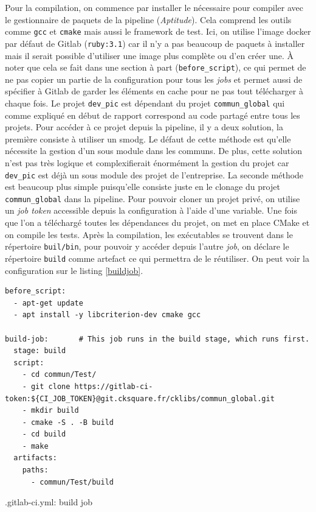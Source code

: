 \documentclass[a4paper]{article}
\begin{document}
Pour la compilation, on commence par installer le nécessaire pour compiler avec
le gestionnaire de paquets de la pipeline (\textit{Aptitude}). Cela comprend les
outils comme \verb|gcc| et \verb|cmake| mais aussi le framework de test. Ici, on
utilise l'image docker par défaut de Gitlab (\verb|ruby:3.1|) car il n'y a pas
beaucoup de paquets à installer mais il serait possible d'utiliser une image
plus complète ou d'en créer une. À noter que cela se fait dans une section à
part (\verb|before_script|), ce qui permet de ne pas copier un partie de la
configuration pour tous les \textit{jobs} et permet aussi de spécifier à Gitlab
de garder les éléments en cache pour ne pas tout télécharger à chaque fois. Le
projet \verb|dev_pic| est dépendant du projet \verb|commun_global| qui comme
expliqué en début de rapport correspond au code partagé entre tous les projets.
Pour accéder à ce projet depuis la pipeline, il y a deux solution, la première
consiste à utiliser un \gls{smodg}. Le défaut de cette méthode est qu'elle
nécessite la gestion d'un sous module dans les communs. De plus, cette solution
n'est pas très logique et complexifierait énormément la gestion du projet car
\verb|dev_pic| est déjà un sous module des projet de l'entreprise. La seconde
méthode est beaucoup plus simple puisqu'elle consiste juste en le clonage du
projet \verb|commun_global| dans la pipeline. Pour pouvoir cloner un projet
privé, on utilise un \textit{job token} accessible depuis la configuration à
l'aide d'une variable. Une fois que l'on a téléchargé toutes les dépendances du
projet, on met en place CMake et on compile les tests. Après la compilation, les
exécutables se trouvent dans le répertoire \verb|buil/bin|, pour pouvoir y
accéder depuis l'autre \textit{job}, on déclare le répertoire \verb|build| comme
artefact ce qui permettra de le réutiliser. On peut voir la configuration sur le
listing \ref{buildjob}.

\begin{listing}[ht!]
\begin{verbatim}
before_script:
  - apt-get update
  - apt install -y libcriterion-dev cmake gcc

build-job:       # This job runs in the build stage, which runs first.
  stage: build
  script:
    - cd commun/Test/
    - git clone https://gitlab-ci-token:${CI_JOB_TOKEN}@git.cksquare.fr/cklibs/commun_global.git
    - mkdir build
    - cmake -S . -B build
    - cd build
    - make
  artifacts:
    paths:
      - commun/Test/build
\end{verbatim}
\caption{.gitlab-ci.yml: build job}
\label{buildjob}
\end{listing}
\end{document}
